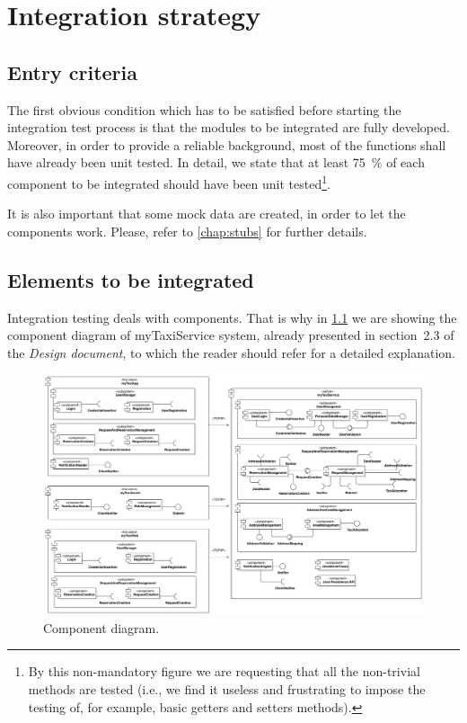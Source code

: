 \chapter{Integration strategy}\label{chap:strategy}



\section{Entry criteria}
The first obvious condition which has to be satisfied before starting the integration test process is that the modules to be integrated are fully developed. Moreover, in order to provide a reliable background, most of the functions shall have already been unit tested. In detail, we state that at least \SI{75}{\percent} of each component to be integrated should have been unit tested\footnote{By this \mbox{non-mandatory} figure we are requesting that all the \mbox{non-trivial} methods are tested (i.e., we find it useless and frustrating to impose the testing of, for example, basic getters and setters methods).}. 

It is also important that some mock data are created, in order to let the components work. Please, refer to \cref{chap:stubs} for further details.



\section{Elements to be integrated}
Integration testing deals with components. That is why in \cref{fig:component} we are showing the component diagram of myTaxiService system, already presented in section~2.3 of the \emph{Design document}, to which the reader should refer for a detailed explanation.

\begin{figure}%
	\includegraphics[width=\textwidth]{img/ComponentView__ComponentDiagram_1}%
	\caption{Component diagram.}%
	\label{fig:component}%
\end{figure}

